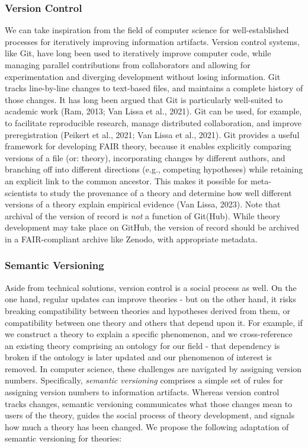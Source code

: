\documentclass[
  man, noextraspace,floatsintext]{apa7}
\begin{document}
\subsubsection{Version Control}\label{version-control}

We can take inspiration from the field of computer science for well-established processes for iteratively improving information artifacts.
Version control systems, like Git, have long been used to iteratively improve computer code, while managing parallel contributions from collaborators and allowing for experimentation and diverging development without losing information.
Git tracks line-by-line changes to text-based files,
and maintains a complete history of those changes.
It has long been argued that Git is particularly well-suited to academic work (Ram, 2013; Van Lissa et al., 2021).
Git can be used, for example, to facilitate reproducible research, manage distributed collaboration, and improve preregistration (Peikert et al., 2021; Van Lissa et al., 2021).
Git provides a useful framework for developing FAIR theory,
because it enables explicitly comparing versions of a file (or: theory),
incorporating changes by different authors,
and branching off into different directions (e.g., competing hypotheses) while retaining an explicit link to the common ancestor.
This makes it possible for meta-scientists to study the provenance of a theory and determine how well different versions of a theory explain empirical evidence (Van Lissa, 2023).
Note that archival of the version of record is \emph{not} a function of Git(Hub).
While theory development may take place on GitHub, the version of record should be archived in a FAIR-compliant archive like Zenodo, with appropriate metadata.

\subsubsection{Semantic Versioning}\label{semantic-versioning}

Aside from technical solutions, version control is a social process as well.
On the one hand, regular updates can improve theories - but on the other hand, it risks breaking compatibility between theories and hypotheses derived from them, or compatibility between one theory and others that depend upon it.
For example, if we construct a theory to explain a specific phenomenon, and we cross-reference an existing theory comprising an ontology for our field - that dependency is broken if the ontology is later updated and our phenomenon of interest is removed.
In computer science, these challenges are navigated by assigning version numbers.
Specifically, \emph{semantic versioning} comprises a simple set of rules for assigning version numbers to information artifacts.
Whereas version control tracks changes,
semantic versioning communicates what those changes mean to users of the theory,
guides the social process of theory development, and signals how much a theory has been changed.
We propose the following adaptation of semantic versioning for theories:
\end{document}
